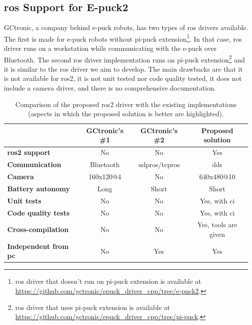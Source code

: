 \subsection{\ac{ros} Support for E-puck2}
GCtronic, a company behind e-puck robots, has two types of \ac{ros} drivers available.
The first is made for e-puck robots without pi-puck extension\footnote{\ac{ros} driver that doesn't run on pi-puck extension is available at \url{https://github.com/gctronic/epuck_driver_cpp/tree/e-puck2}.}.
In that case, \ac{ros} driver runs on a workstation while communicating with the e-puck over Bluetooth. The second \ac{ros} driver implementation runs on pi-puck extension\footnote{\ac{ros} driver that uses pi-puck extension is available at \url{https://github.com/gctronic/epuck_driver_cpp/tree/pi-puck}.} and it is similar to the \ac{ros} driver we aim to develop. The main drawbacks are that it is not available for \ac{ros2}, it is not unit tested nor code quality tested, it does not include a camera driver, and there is no comprehensive documentation.

\begin{table}[H]
    \begin{adjustwidth}{-1.5in}{-1.5in}
    \centering
    \begin{tabular}{|l|c|c|c|}
         \hline
         & \textbf{GCtronic's \#1} & \textbf{GCtronic's \#2} & \textbf{Proposed solution} \\
         \hline
         \rowcolor{llgray} \textbf{\ac{ros2} support} & No & No & Yes \\
         \hline
         \rowcolor{llgray} \textbf{Communication} & Bluetooth & \acs{udpros}/\acs{tcpros} & \ac{dds} \\
         \hline
         \rowcolor{llgray} \textbf{Camera} & 160x120@4 & No & 640x480@10 \\
         \hline
         \textbf{Battery autonomy} & Long & Short & Short \\
         \hline
         \rowcolor{llgray} \textbf{Unit tests} & No & No & Yes, with \ac{ci} \\
         \hline
         \rowcolor{llgray} \textbf{Code quality tests} & No & No & Yes, with \ac{ci} \\
         \hline
         \rowcolor{llgray} \textbf{Cross-compilation} & No & No & Yes, tools are given  \\
         \hline
         \rowcolor{llgray} \textbf{Independent from \acs{pc}} & No & Yes & Yes  \\
         \hline
    \end{tabular}
    \end{adjustwidth}
    \caption[Comparison of the proposed \ac{ros} drive with the existing implementations]{Comparison of the proposed \ac{ros2} driver with the existing implementations (aspects in which the proposed solution is better are highlighted).}
    \label{tab:background:epuck_ros}
\end{table}

